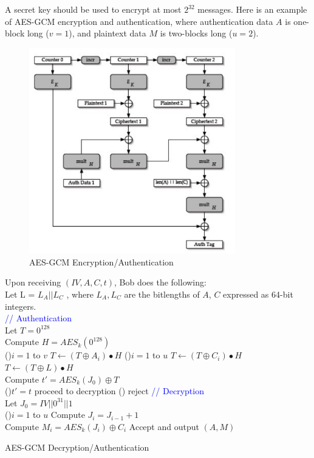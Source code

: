 \documentclass[12pt,titlepage]{article}
\begin{document}
A secret key should be used to encrypt at most $2^{32}$ messages.
\newpage
Here is an example of AES-GCM encryption and authentication, where authentication data $A$ is one-block long ($v = 1$), and plaintext data $M$ is two-blocks long ($u = 2$).
\begin{center}
	\begin{figure}[h!]
		\centering
		\includegraphics[width=0.8\textwidth]{AES_GCM.png}
		\caption{AES-GCM Encryption/Authentication}
	\end{figure}
\end{center}
\newpage
\begin{algorithm}
	Upon receiving $(IV, A, C, t)$, Bob does the following:\\
	Let L = $L_A || L_C$ , where $L_A , L_C$ are the bitlengths of $A$, $C$ expressed as 64-bit integers.\\
	\textcolor{blue}{// Authentication}\\
	Let $T = 0^{128}$\\
	Compute $H = AES_k (0^{128})$\\
	\For(){$i = 1$ to $v$}{
		$T \leftarrow (T \oplus A_i) \bullet H$
	}
	\For(){$i = 1$ to $u$}{
		$T \leftarrow (T \oplus C_i) \bullet H$
	}
	$T \leftarrow (T \oplus L) \bullet H$\\
	Compute $t' = AES_k (J_0) \oplus T$\\
	\If(){$t' = t$}{
		proceed to decryption
	} \Else(){
		reject
	}
	\textcolor{blue}{// Decryption}\\
	Let $J_0 = IV || 0^{31} || 1$\\
	\For(){$i = 1$ to $u$}{
		Compute $J_i = J_{i-1} + 1$\\
		Compute $M_i = AES_k (J_i) \oplus C_i$
	}
	Accept and output $(A, M)$
	\caption{AES-GCM Decryption/Authentication}
\end{algorithm}
\end{document}

